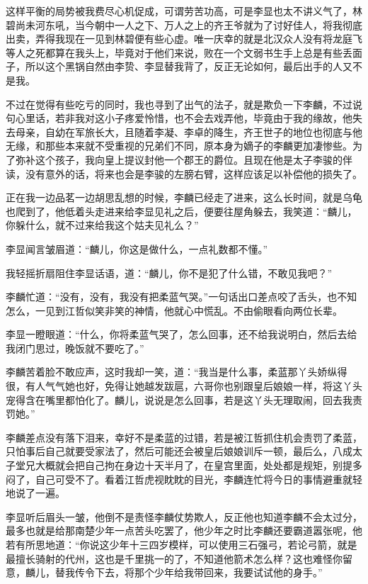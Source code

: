 这样平衡的局势被我费尽心机促成，可谓劳苦功高，可是李显也太不讲义气了，林碧尚未河东吼，当今朝中一人之下、万人之上的齐王爷就为了讨好佳人，将我彻底出卖，弄得我现在一见到林碧便有些心虚。唯一庆幸的就是北汉众人没有将龙庭飞等人之死都算在我头上，毕竟对于他们来说，败在一个文弱书生手上总是有些丢面子，所以这个黑锅自然由李贽、李显替我背了，反正无论如何，最后出手的人又不是我。

不过在觉得有些吃亏的同时，我也寻到了出气的法子，就是欺负一下李麟，不过说句心里话，若非我对这小子疼爱怜惜，也不会去戏弄他，毕竟由于我的缘故，他失去母亲，自幼在军旅长大，且随着李凝、李卓的降生，齐王世子的地位也彻底与他无缘，和那些本来就不受重视的兄弟们不同，原本身为嫡子的李麟更加凄惨些。为了弥补这个孩子，我向皇上提议封他一个郡王的爵位。且现在他是太子李骏的伴读，没有意外的话，将来也会是李骏的左膀右臂，这样应该足以补偿他的损失了。

正在我一边品茗一边胡思乱想的时候，李麟已经走了进来，这么长时间，就是乌龟也爬到了，他低着头走进来给李显见礼之后，便要往屋角躲去，我笑道：“麟儿，你躲什么，就不过来给我这个姑夫见礼么？”

李显闻言皱眉道：“麟儿，你这是做什么，一点礼数都不懂。”

我轻摇折扇阻住李显话语，道：“麟儿，你不是犯了什么错，不敢见我吧？”

李麟忙道：“没有，没有，我没有把柔蓝气哭。”一句话出口差点咬了舌头，也不知怎么，一见到江哲似笑非笑的神情，他就心中慌乱。不由偷眼看向两位长辈。

李显一瞪眼道：“什么，你将柔蓝气哭了，怎么回事，还不给我说明白，然后去给我闭门思过，晚饭就不要吃了。”

李麟苦着脸不敢应声，这时我却一笑，道：“我当是什么事，柔蓝那丫头娇纵得很，有人气气她也好，免得让她越发跋扈，六哥你也别跟皇后娘娘一样，将这丫头宠得含在嘴里都怕化了。麟儿，说说是怎么回事，若是这丫头无理取闹，回去我责罚她。”

李麟差点没有落下泪来，幸好不是柔蓝的过错，若是被江哲抓住机会责罚了柔蓝，只怕事后自己就要受家法了，然后可能还会被皇后娘娘训斥一顿，最后么，八成太子堂兄大概就会把自己拘在身边十天半月了，在皇宫里面，处处都是规矩，别提多闷了，自己可受不了。看着江哲虎视眈眈的目光，李麟连忙将今日的事情避重就轻地说了一遍。

李显听后眉头一皱，他倒不是责怪李麟仗势欺人，反正他也知道李麟不会太过分，最多也就是给那南楚少年一点苦头吃罢了，他少年之时比李麟还要霸道嚣张呢，他若有所思地道：“你说这少年十三四岁模样，可以使用三石强弓，若论弓箭，就是最擅长骑射的代州，这也是千里挑一的了，不知道他箭术怎么样？这也难怪你留意，麟儿，替我传令下去，将那个少年给我带回来，我要试试他的身手。”

